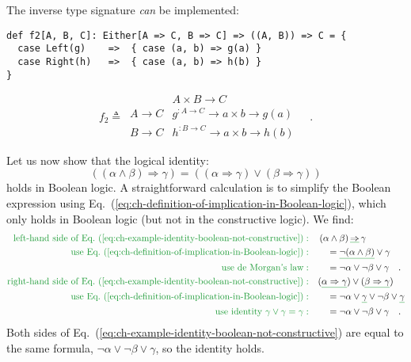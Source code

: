 The inverse type signature \emph{can} be implemented:
\begin{lstlisting}
def f2[A, B, C]: Either[A => C, B => C] => ((A, B)) => C = {
  case Left(g)    =>  { case (a, b) => g(a) }
  case Right(h)   =>  { case (a, b) => h(b) }
}
\end{lstlisting}
\[
f_{2}\triangleq\,\begin{array}{|c||c|}
 & A\times B\rightarrow C\\
\hline A\rightarrow C & g^{:A\rightarrow C}\rightarrow a\times b\rightarrow g(a)\\
B\rightarrow C & h^{:B\rightarrow C}\rightarrow a\times b\rightarrow h(b)
\end{array}\quad.
\]

Let us now show that the logical identity:
\begin{equation}
((\alpha\wedge\beta)\Rightarrow\gamma)=((\alpha\Rightarrow\gamma)\vee(\beta\Rightarrow\gamma))\label{eq:ch-example-identity-boolean-not-constructive}
\end{equation}
holds in Boolean logic. A straightforward calculation is to simplify
the Boolean expression using Eq.~(\ref{eq:ch-definition-of-implication-in-Boolean-logic}),
which only holds in Boolean logic (but not in the constructive logic).
We find:
\begin{align*}
{\color{greenunder}\text{left-hand side of Eq.~(\ref{eq:ch-example-identity-boolean-not-constructive})}:}\quad & \left(\alpha\wedge\beta\right)\gunderline{\Rightarrow}\,\gamma\\
{\color{greenunder}\text{use Eq.~(\ref{eq:ch-definition-of-implication-in-Boolean-logic})}:}\quad & \quad=\gunderline{\neg(\alpha\wedge\beta)}\vee\gamma\\
{\color{greenunder}\text{use de Morgan\textsf{'}s law}:}\quad & \quad=\neg\alpha\vee\neg\beta\vee\gamma\quad.\\
{\color{greenunder}\text{right-hand side of Eq.~(\ref{eq:ch-example-identity-boolean-not-constructive})}:}\quad & (\gunderline{\alpha\Rightarrow\gamma})\vee(\gunderline{\beta\Rightarrow\gamma})\\
{\color{greenunder}\text{use Eq.~(\ref{eq:ch-definition-of-implication-in-Boolean-logic})}:}\quad & \quad=\neg\alpha\vee\gunderline{\gamma}\vee\neg\beta\vee\gunderline{\gamma}\\
{\color{greenunder}\text{use identity }\gamma\vee\gamma=\gamma:}\quad & \quad=\neg\alpha\vee\neg\beta\vee\gamma\quad.
\end{align*}
Both sides of Eq.~(\ref{eq:ch-example-identity-boolean-not-constructive})
are equal to the same formula, $\neg\alpha\vee\neg\beta\vee\gamma$,
so the identity holds.

